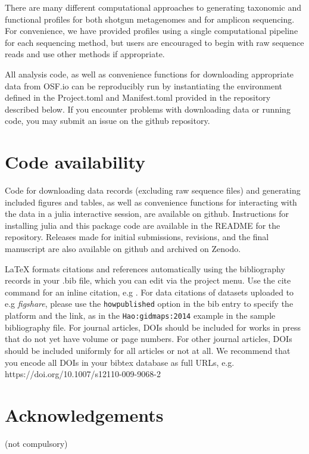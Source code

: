 \documentclass[fleqn,10pt]{wlscirep}
\begin{document}
There are many different computational approaches to generating taxonomic and functional profiles
for both shotgun metagenomes and for amplicon sequencing.
For convenience, we have provided profiles using a single computational pipeline for each sequencing method,
but users are encouraged to begin with raw sequence reads and use other methods if appropriate.

All analysis code, as well as convenience functions for downloading appropriate data from OSF.io
can be reproducibly run by instantiating the environment defined in the Project.toml and Manifest.toml
provided in the repository described below.
If you encounter problems with downloading data or running code, you may submit an issue on the github repository.

\section*{Code availability}

Code for downloading data records (excluding raw sequence files) and generating included figures and tables,
as well as convenience functions for interacting with the data in a julia interactive session,
are available on github.
Instructions for installing julia and this package code are available in the README for the repository.
Releases made for initial submissions, revisions, and the final manuscript
are also available on github and archived on Zenodo.



\noindent LaTeX formats citations and references automatically using the bibliography records in your .bib file, which you can edit via the project menu.
Use the cite command for an inline citation, e.g 
\cite{Kaufman2020, Figueredo:2009dg, Babichev2002, behringer2014manipulating}.
For data citations of datasets uploaded to e.g 
\emph{figshare}, please use the \verb|howpublished| option in the bib entry to specify the platform and the link, as in the \verb|Hao:gidmaps:2014| example in the sample bibliography file.
For journal articles, DOIs should be included for works in press that do not yet have volume or page numbers.
For other journal articles, DOIs should be included uniformly for all articles or not at all.
We recommend that you encode all DOIs in your bibtex database as full URLs, e.g.
https://doi.org/10.1007/s12110-009-9068-2


\section*{Acknowledgements} (not compulsory)
\end{document}
